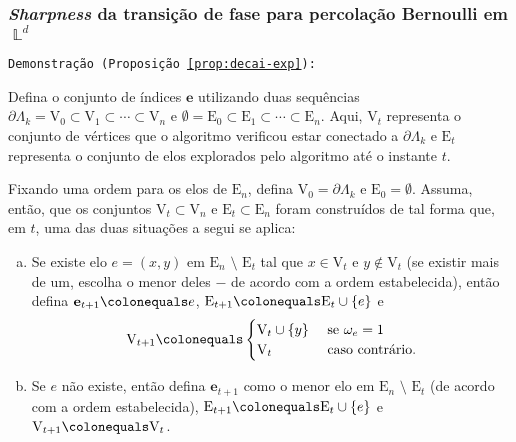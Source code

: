 \documentclass[9pt]{beamer}
\theoremstyle{definition} %
\DeclareMathOperator{\LX}{\mathbb{L}} %
\begin{document}
	\begin{frame}[t]
		\frametitle{\textit{Sharpness} da transição de fase para percolação Bernoulli em $\LX^d$}
		\texttt{Demonstração (Proposição \ref{prop:decai-exp}):}
		
		Defina o conjunto de índices $\mathbf{e}$ utilizando duas sequências $\partial\Lambda_k = \text{V}_0 \subset \text{V}_1 \subset \cdots \subset \text{V}_n$ e $\emptyset = \text{E}_0 \subset \text{E}_1 \subset \cdots \subset \text{E}_n$. Aqui, $\text{V}_t$ representa o conjunto de vértices que o algoritmo verificou estar conectado a $\partial\Lambda_k$ e $\text{E}_t$ representa o conjunto de elos explorados pelo algoritmo até o instante $t$.\pause
		
		Fixando uma ordem para os elos de $\text{E}_n$, defina $\text{V}_0 = \partial\Lambda_k$ e $\text{E}_0 = \emptyset$. Assuma, então, que os conjuntos $\text{V}_t \subset \text{V}_n$ e $\text{E}_t \subset \text{E}_n$ foram construídos de tal forma que, em $t$, uma das duas situações a segui se aplica:
		
		\begin{enumerate}[a.]
			\item Se existe elo $e = (x, y)$ em $\text{E}_n \text{~\textbackslash~} \text{E}_t$ tal que $x \in \text{V}_t$ e $y \not\in \text{V}_t$ (se existir mais de um, escolha o menor deles $-$ de acordo com a ordem estabelecida), então defina $\mathbf{e}_{t+1} \colonequals e$, $\text{E}_{t + 1} \colonequals \text{E}_t \cup \{e\}$ e
			\[ \text{V}_{t + 1} \colonequals
			\begin{cases}
			\text{V}_t \cup \{y\} &\text{ se } \omega_e = 1 \\
			\text{V}_t &\text{ caso contrário}.
			\end{cases}
			\]
			\item Se $e$ não existe, então defina $\mathbf{e}_{t+1}$ como o menor elo em $\text{E}_n \text{~\textbackslash~} \text{E}_t$ (de acordo com a ordem estabelecida), $\text{E}_{t + 1} \colonequals \text{E}_t \cup \{e\}$ e $\text{V}_{t + 1} \colonequals \text{V}_t$.
		\end{enumerate}
	\end{frame}
\end{document}
